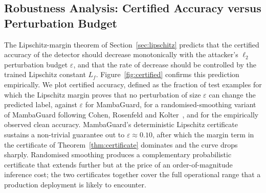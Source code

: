 \documentclass[journal,10pt,twocolumn]{IEEEtran}
\begin{document}
\subsection{Robustness Analysis: Certified Accuracy versus Perturbation Budget}
\label{sec:robustness}
The Lipschitz-margin theorem of Section~\ref{sec:lipschitz} predicts that the certified accuracy of the detector should decrease monotonically with the attacker's $\ell_{2}$ perturbation budget $\varepsilon$, and that the rate of decrease should be controlled by the trained Lipschitz constant $L_{f}$. Figure~\ref{fig:certified} confirms this prediction empirically. We plot certified accuracy, defined as the fraction of test examples for which the Lipschitz margin proves that no perturbation of size $\varepsilon$ can change the predicted label, against $\varepsilon$ for MambaGuard, for a randomised-smoothing variant of MambaGuard following Cohen, Rosenfeld and Kolter~\cite{Cohen2019RandSmooth}, and for the empirically observed clean accuracy. MambaGuard's deterministic Lipschitz certificate sustains a non-trivial guarantee out to $\varepsilon\approx 0.10$, after which the margin term in the certificate of Theorem~\ref{thm:certificate} dominates and the curve drops sharply. Randomised smoothing produces a complementary probabilistic certificate that extends further but at the price of an order-of-magnitude inference cost; the two certificates together cover the full operational range that a production deployment is likely to encounter.
\end{document}
